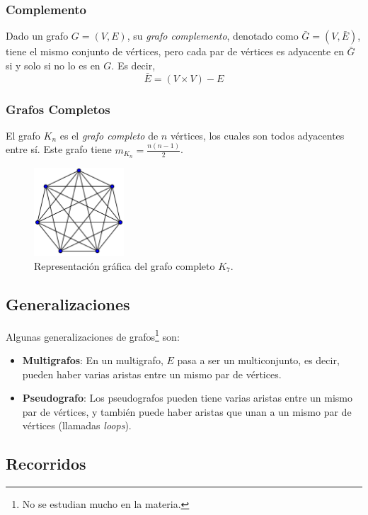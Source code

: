 \documentclass[a4paper]{report}
\begin{document}
\subsubsection{Complemento}

Dado un grafo $G = (V, E)$, su \textit{grafo complemento}, denotado como $\bar{G} = (V, \bar{E})$, tiene el mismo conjunto de vértices, pero cada par de vértices es adyacente en $\bar{G}$ si y solo si no lo es en $G$. Es decir,
$$\bar{E} = (V \times V) - E$$

\subsubsection{Grafos Completos}

El grafo $K_n$ es el \textit{grafo completo} de $n$ vértices, los cuales son todos adyacentes entre sí. Este grafo tiene $m_{K_n} = \frac{n(n-1)}{2}$.

\begin{figure}[H]
    \centering
    \includegraphics[width=0.3\textwidth]{K7.png}
    \caption*{Representación gráfica del grafo completo $K_7$.}
\end{figure}

\subsection{Generalizaciones}

Algunas generalizaciones de grafos\footnote{No se estudian mucho en la materia.} son:
\begin{itemize}
    \item \textbf{Multigrafos}: En un multigrafo, $E$ pasa a ser un multiconjunto, es decir, pueden haber varias aristas entre un mismo par de vértices.
    \item \textbf{Pseudografo}: Los pseudografos pueden tiene varias aristas entre un mismo par de vértices, y también puede haber aristas que unan a un mismo par de vértices (llamadas \textit{loops}).
\end{itemize}

\subsection{Recorridos}
\end{document}
